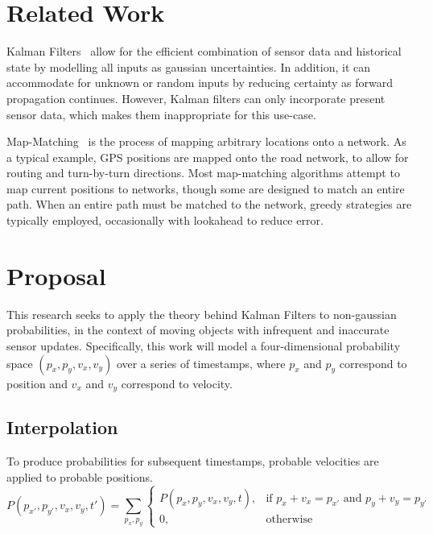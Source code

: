 \documentclass{article}
\begin{document}
\section{Related Work}

  Kalman Filters~\cite{kalmanJBE60} allow for the efficient combination of sensor data and historical state by modelling all inputs as gaussian uncertainties. In addition, it can accommodate for unknown or random inputs by reducing certainty as forward propagation continues. However, Kalman filters can only incorporate present sensor data, which makes them inappropriate for this use-case.

  Map-Matching~\cite{brakatsoulasVLDB05} is the process of mapping arbitrary locations onto a network. As a typical example, GPS positions are mapped onto the road network, to allow for routing and turn-by-turn directions.
Most map-matching algorithms attempt to map current positions to networks, though some are designed to match an entire path. When an entire path must be matched to the network, greedy strategies are typically employed, occasionally with lookahead to reduce error.

\section{Proposal}

This research seeks to apply the theory behind Kalman Filters to non-gaussian probabilities, in the context of moving objects with infrequent and inaccurate sensor updates. Specifically, this work will model a four-dimensional probability space $(p_x, p_y, v_x, v_y)$ over a series of timestamps, where $p_x$ and $p_y$ correspond to position and $v_x$ and $v_y$ correspond to velocity.

\subsection{Interpolation}
To produce probabilities for subsequent timestamps, probable velocities are applied to probable positions.
\begin{equation}
  P(p_{x'}, p_{y'}, v_x, v_y, t') = \sum_{p_x, p_y}
  \begin{cases}
    P(p_x, p_y, v_x, v_y, t), & \text{if } p_x + v_x = p_{x'} \text { and } p_y + v_y = p_{y'} \\
    0, & \text{otherwise}
  \end{cases}
\end{equation}
\end{document}
